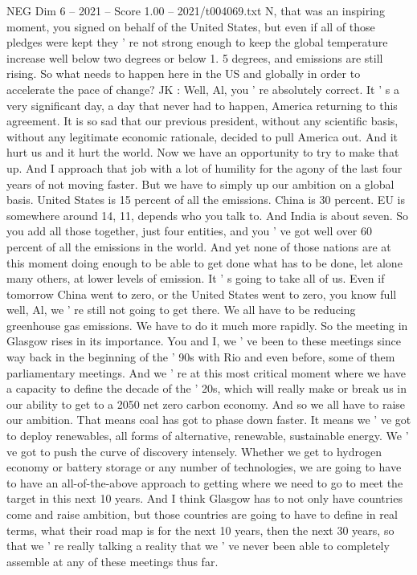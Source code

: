 \begin{textsample}{NEG Dim 6 – 2021 – Score 1.00 – 2021/t004069.txt}
N, that was an inspiring moment, you signed on behalf of the United States, but even if all of those pledges were kept they ' re not strong enough to keep the global temperature increase well below two degrees or below 1. 5 degrees, and emissions are still rising.
So what needs to happen here in the US and globally in order to accelerate the pace of change?
JK : Well, Al, you ' re absolutely correct.
It ' s a very significant day, a day that never had to happen, America returning to this agreement.
It is so sad that our previous president, without any scientific basis, without any legitimate economic rationale, decided to pull America out.
And it hurt us and it hurt the world.
Now we have an opportunity to try to make that up.
And I approach that job with a lot of humility for the agony of the last four years of not moving faster.
But we have to simply up our ambition on a global basis.
United States is 15 percent of all the emissions.
China is 30 percent.
EU is somewhere around 14, 11, depends who you talk to.
And India is about seven.
So you add all those together, just four entities, and you ' ve got well over 60 percent of all the emissions in the world.
And yet none of those nations are at this moment doing enough to be able to get done what has to be done, let alone many others, at lower levels of emission.
It ' s going to take all of us.
Even if tomorrow China went to zero, or the United States went to zero, you know full well, Al, we ' re still not going to get there.
We all have to be reducing greenhouse gas emissions.
We have to do it much more rapidly.
So the meeting in Glasgow rises in its importance.
You and I, we ' ve been to these meetings since way back in the beginning of the ' 90s with Rio and even before, some of them parliamentary meetings.
And we ' re at this most critical moment where we have a capacity to define the decade of the ' 20s, which will really make or break us in our ability to get to a 2050 net zero carbon economy.
And so we all have to raise our ambition.
That means coal has got to phase down faster.
It means we ' ve got to deploy renewables, all forms of alternative, renewable, sustainable energy.
We ' ve got to push the curve of discovery intensely.
Whether we get to hydrogen economy or battery storage or any number of technologies, we are going to have to have an all-of-the-above approach to getting where we need to go to meet the target in this next 10 years.
And I think Glasgow has to not only have countries come and raise ambition, but those countries are going to have to define in real terms, what their road map is for the next 10 years, then the next 30 years, so that we ' re really talking a reality that we ' ve never been able to completely assemble at any of these meetings thus far.

\end{textsample}
